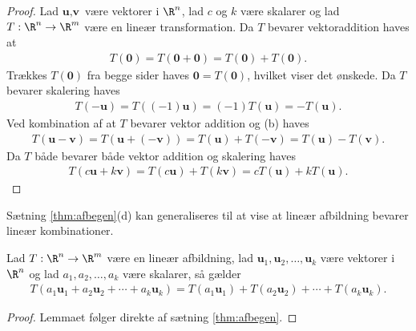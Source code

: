 %
\begin{proof}
Lad $\textbf{u}, \textbf{v}$ være vektorer i $\R^n$, lad $c$ og $k$ være skalarer og lad $T: \R^n \rightarrow \R^m$ være en lineær transformation.
Da $T$ bevarer vektoraddition haves at
%
\begin{align*}
T(\textbf{0}) = T(\textbf{0} + \textbf{0}) = T(\textbf{0}) + T(\textbf{0}).
\end{align*}
%
Trækkes $T(\textbf{0})$ fra begge sider haves $\textbf{0} = T(\textbf{0})$, hvilket viser det ønskede.
%
Da $T$ bevarer skalering haves
% 
\begin{align*}
T(-\textbf{u}) = T((-1)\textbf{u}) = (-1)T(\textbf{u}) = -T(\textbf{u}).
\end{align*}
%
Ved kombination af at $T$ bevarer vektor addition og (b) haves
%
\begin{align*}
T(\textbf{u}-\textbf{v}) = T(\textbf{u}+(-\textbf{v})) = T(\textbf{u})+T(-\textbf{v}) = T(\textbf{u}) - T(\textbf{v}).
\end{align*}
%
Da $T$ både bevarer både vektor addition og skalering haves 
%
\begin{align*}
T(c\textbf{u} + k\textbf{v}) = T(c\textbf{u}) + T(k\textbf{v}) = cT(\textbf{u}) + kT(\textbf{u}).
\end{align*}
\end{proof}
%
Sætning \ref{thm:afbegen}(d) kan generaliseres til at vise at lineær afbildning bevarer lineær kombinationer.
%
\begin{lem}{}{}
Lad $T:\R^n \rightarrow \R^m$ være en lineær afbildning, lad      $\textbf{u}_1,\textbf{u}_2,\ldots,\textbf{u}_k$ være vektorer i $\R^n$ og lad $a_1,a_2,\ldots,a_k$ være skalarer, så gælder
%
\begin{align*}
T(a_1\textbf{u}_1 + a_2\textbf{u}_2 + \cdots + a_k\textbf{u}_k) = T(a_1\textbf{u}_1) + T(a_2\textbf{u}_2) + \cdots + T(a_k\textbf{u}_k).
\end{align*}
%
\end{lem}
%
\begin{proof}
Lemmaet følger direkte af sætning \ref{thm:afbegen}.
\end{proof}